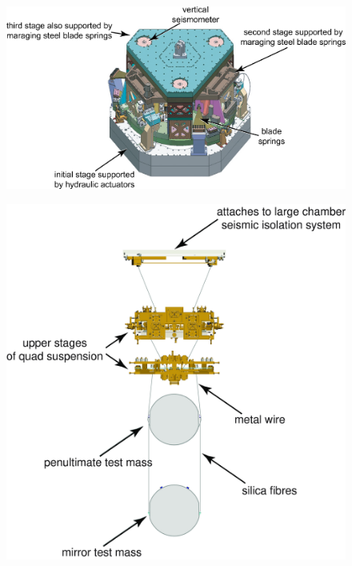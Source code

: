 \documentclass{article}
\begin{document}


\begin{figure}[]
\begin{center}
\includegraphics[width=1\columnwidth]{./figures/fig3/fig3}
\caption{ \protect}
\end{center}
\end{figure}


\begin{figure}[]
\begin{center}
\includegraphics[width=1\columnwidth]{./figures/fig4/fig4}
\caption{ \protect}
\end{center}
\end{figure}
\end{document}

